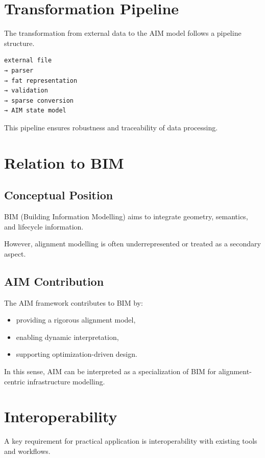 \section{Transformation Pipeline}

The transformation from external data to the AIM model follows a
pipeline structure.

\begin{verbatim}
external file
→ parser
→ fat representation
→ validation
→ sparse conversion
→ AIM state model
\end{verbatim}

This pipeline ensures robustness and traceability of data processing.


\section{Relation to BIM}

\subsection{Conceptual Position}

BIM (Building Information Modelling) aims to integrate geometry,
semantics, and lifecycle information.

However, alignment modelling is often underrepresented or treated as a
secondary aspect.

\subsection{AIM Contribution}

The AIM framework contributes to BIM by:
\begin{itemize}
\item providing a rigorous alignment model,
\item enabling dynamic interpretation,
\item supporting optimization-driven design.
\end{itemize}

In this sense, AIM can be interpreted as a specialization of BIM for
alignment-centric infrastructure modelling.


\section{Interoperability}

A key requirement for practical application is interoperability with
existing tools and workflows.

